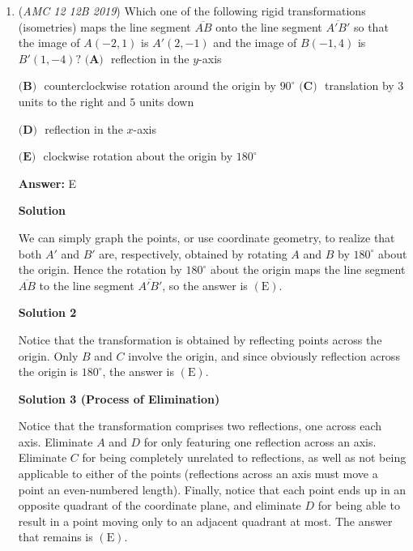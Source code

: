 \begin{enumerate}
 minor edit (the inclusion of not) by AlcBoy1729

 


	\item (\textit{AMC 12 12B 2019}) Which one of the following rigid transformations (isometries) maps the line segment $\overline{AB}$ onto the line segment $\overline{A'B'}$ so that the image of $A(-2,1)$ is $A'(2,-1)$ and the image of $B(-1,4)$ is $B'(1,-4)?$
$\textbf{(A) }$ reflection in the $y$-axis


 $\textbf{(B) }$ counterclockwise rotation around the origin by $90^{\circ}$
$\textbf{(C) }$ translation by $3$ units to the right and $5$ units down


 $\textbf{(D) }$ reflection in the $x$-axis


 $\textbf{(E) }$ clockwise rotation about the origin by $180^{\circ}$

 \textbf{Answer: }E



\textbf{Solution}

We can simply graph the points, or use coordinate geometry, to realize that both $A'$ and $B'$ are, respectively, obtained by rotating $A$ and $B$ by $180^{\circ}$ about the origin. Hence the rotation by $180^{\circ}$ about the origin maps the line segment $\overline{AB}$ to the line segment $\overline{A'B'}$, so the answer is $\boxed{(\text{E})}$.

 


 



\textbf{Solution 2}

Notice that the transformation is obtained by reflecting points across the origin. Only $B$ and $C$ involve the origin, and since obviously reflection across the origin is $180^\circ$, the answer is $\boxed{(\text{E})}$. 

 



\textbf{Solution 3 (Process of Elimination)}

Notice that the transformation comprises two reflections, one across each axis. Eliminate $A$ and $D$ for only featuring one reflection across an axis. Eliminate $C$ for being completely unrelated to reflections, as well as not being applicable to either of the points (reflections across an axis must move a point an even-numbered length). Finally, notice that each point ends up in an opposite quadrant of the coordinate plane, and eliminate $D$ for being able to result in a point moving only to an adjacent quadrant at most. The answer that remains is $\boxed{(\text{E})}$. 


\end{enumerate}
